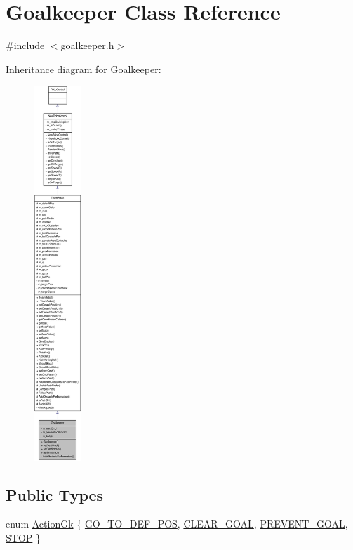 \hypertarget{classGoalkeeper}{
\section{Goalkeeper Class Reference}
\label{classGoalkeeper}
}


{\ttfamily \#include $<$goalkeeper.h$>$}



Inheritance diagram for Goalkeeper:\nopagebreak
\begin{figure}[H]
\begin{center}
\leavevmode
\includegraphics[height=400pt]{classGoalkeeper__inherit__graph}
\end{center}
\end{figure}
\subsection*{Public Types}
\begin{DoxyCompactItemize}
\item 
enum \hyperlink{classGoalkeeper_a25db0bed632b4bdb87532b0fbbf45855}{ActionGk} \{ \hyperlink{classGoalkeeper_a25db0bed632b4bdb87532b0fbbf45855af1fa8ff07676a5e27f9cc78f6811c704}{GO\_\-TO\_\-DEF\_\-POS}, 
\hyperlink{classGoalkeeper_a25db0bed632b4bdb87532b0fbbf45855a16f1efd31d6ead68306d343d85059ca2}{CLEAR\_\-GOAL}, 
\hyperlink{classGoalkeeper_a25db0bed632b4bdb87532b0fbbf45855a96b7bc8aa3f3a4d1b68955f8d757e9c1}{PREVENT\_\-GOAL}, 
\hyperlink{classGoalkeeper_a25db0bed632b4bdb87532b0fbbf45855a7940a4d0074c5f5bb33743797387c2c1}{STOP}
 \}
\end{DoxyCompactItemize}
